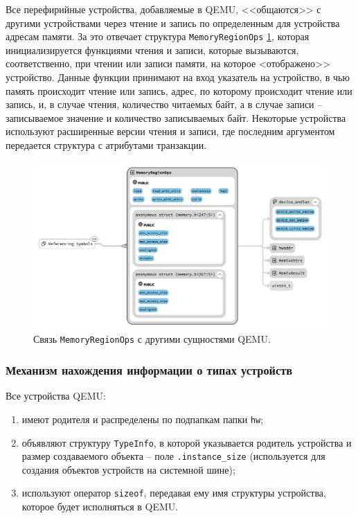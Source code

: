 
Все перефирийные устройства, добавляемые в QEMU, <<общаются>> с другими устройствами через чтение и запись
по определенным для устройства адресам памяти.
За это отвечает структура \texttt{MemoryRegionOps} \ref{fig:mem-reg-ops},
которая инициализируется функциями чтения и записи,
которые вызываются, соответственно, при чтении или записи памяти, на которое <отображено>> устройство.
Данные функции принимают на вход указатель на устройство, в чью память происходит чтение или запись,
адрес, по которому происходит чтение или запись, и, в случае чтения, количество читаемых байт,
а в случае записи -- записываемое значение и количество записываемых байт.
Некоторые устройства используют расширенные версии чтения и записи, где последним аргументом передается
структура с атрибутами транзакции.

\begin{figure}[!htbp]
    \centering
    \begin{adjustbox}{max totalsize={\textwidth}{\textheight}}
        \includegraphics[]{images/mem_reg_ops_cropped.png}
    \end{adjustbox}
    \caption{Связь \texttt{MemoryRegionOps} с другими сущностями QEMU.}\label{fig:mem-reg-ops}
\end{figure}


\subsubsection{Механизм нахождения информации о типах устройств}\label{sec:ch2/sec1/sub2/sub1}

Все устройства QEMU:
\begin{enumerate}[label={\arabic*)}]
    \item имеют родителя и распределены по подпапкам папки \texttt{hw};
    \item объявляют структуру \texttt{TypeInfo}, в которой указывается родитель устройства
          и размер создаваемого объекта -- поле \texttt{.instance\_size}
          (используется для создания объектов устройств на системной шине);
    \item используют оператор \texttt{sizeof},
          передавая ему имя структуры устройства, которое будет исполняться в QEMU.
\end{enumerate}


